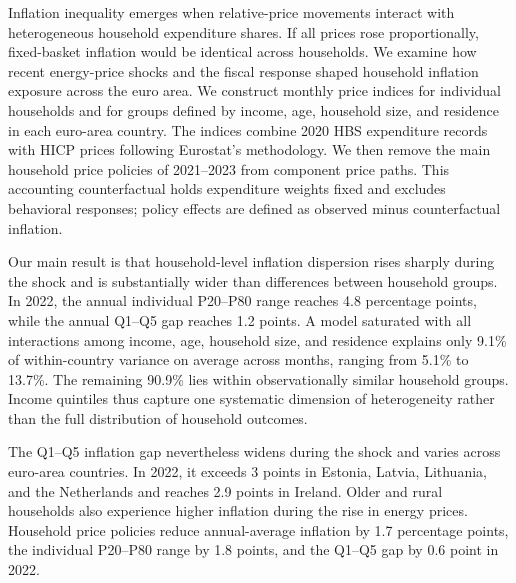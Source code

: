 \documentclass[11pt]{article}
\begin{document}
Inflation inequality emerges when relative-price movements interact with heterogeneous household
expenditure shares. If all prices rose proportionally, fixed-basket inflation would be identical
across households. We examine how recent energy-price shocks and the fiscal response shaped household inflation
exposure across the euro area. We construct monthly price indices for individual households and for groups defined by income, age, household size, and residence in each euro-area country. The indices combine 2020 HBS expenditure records with HICP prices following Eurostat's methodology. We then remove the main household price policies of 2021--2023 from component price paths. This accounting counterfactual holds expenditure weights fixed and excludes behavioral responses; policy effects are defined as observed minus counterfactual inflation.

Our main result is that household-level inflation dispersion rises sharply during the shock and is
substantially wider than differences between household groups. In 2022, the annual individual
P20--P80 range reaches 4.8 percentage points, while the annual Q1--Q5 gap reaches 1.2 points. A
model saturated with all interactions among income, age, household size, and residence explains
only 9.1\% of within-country variance on average across months, ranging from 5.1\% to 13.7\%.
The remaining 90.9\% lies within observationally similar household groups. Income quintiles thus
capture one systematic dimension of heterogeneity rather than the full distribution of household
outcomes.

The Q1--Q5 inflation gap nevertheless widens during the shock and varies across euro-area countries.
In 2022, it exceeds 3 points in Estonia, Latvia, Lithuania, and the Netherlands and reaches 2.9
points in Ireland. Older and rural households also experience higher inflation during the rise in
energy prices. Household price policies reduce annual-average inflation by 1.7 percentage points,
the individual P20--P80 range by 1.8 points, and the Q1--Q5 gap by 0.6 point in 2022.
\end{document}
